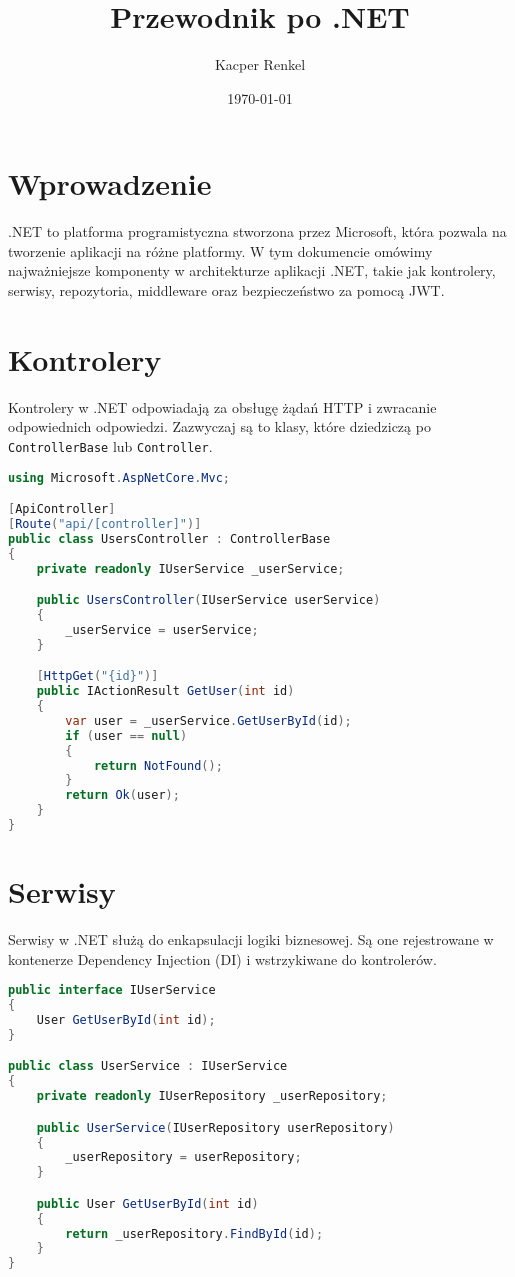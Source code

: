 \documentclass[a4paper,12pt]{article}
\title{Przewodnik po .NET}
\author{Kacper Renkel}
\date{\today}
\begin{document}
\maketitle

\tableofcontents
\newpage

\section{Wprowadzenie}
.NET to platforma programistyczna stworzona przez Microsoft, która pozwala na tworzenie aplikacji na różne platformy. W tym dokumencie omówimy najważniejsze komponenty w architekturze aplikacji .NET, takie jak kontrolery, serwisy, repozytoria, middleware oraz bezpieczeństwo za pomocą JWT.

\section{Kontrolery}
Kontrolery w .NET odpowiadają za obsługę żądań HTTP i zwracanie odpowiednich odpowiedzi. Zazwyczaj są to klasy, które dziedziczą po \texttt{ControllerBase} lub \texttt{Controller}.

\begin{lstlisting}[language=C#, caption=Przykład kontrolera w .NET]
using Microsoft.AspNetCore.Mvc;

[ApiController]
[Route("api/[controller]")]
public class UsersController : ControllerBase
{
    private readonly IUserService _userService;

    public UsersController(IUserService userService)
    {
        _userService = userService;
    }

    [HttpGet("{id}")]
    public IActionResult GetUser(int id)
    {
        var user = _userService.GetUserById(id);
        if (user == null)
        {
            return NotFound();
        }
        return Ok(user);
    }
}
\end{lstlisting}

\section{Serwisy}
Serwisy w .NET służą do enkapsulacji logiki biznesowej. Są one rejestrowane w kontenerze Dependency Injection (DI) i wstrzykiwane do kontrolerów.

\begin{lstlisting}[language=C#, caption=Przykład serwisu w .NET]
public interface IUserService
{
    User GetUserById(int id);
}

public class UserService : IUserService
{
    private readonly IUserRepository _userRepository;

    public UserService(IUserRepository userRepository)
    {
        _userRepository = userRepository;
    }

    public User GetUserById(int id)
    {
        return _userRepository.FindById(id);
    }
}
\end{lstlisting}
\end{document}

